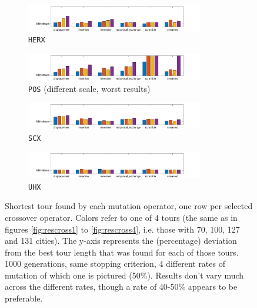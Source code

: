 \begin{figure}[H]
	\centering
%
	\begin{subfigure}[b]{\textwidth}
		\centering
		\includegraphics[width=0.85\textwidth]{mutation/min/xedge_heuristic.png}
		\caption{\texttt{HERX}}
		\label{fig:z}
    	\end{subfigure}
	\begin{subfigure}[b]{\textwidth}
		\centering
		\includegraphics[width=0.85\textwidth]{mutation/min/xposition_based.png}
		\caption{\texttt{POS} (different scale, worst results)}
		\label{fig:z}
    	\end{subfigure}
	\begin{subfigure}[b]{\textwidth}
		\centering
		\includegraphics[width=0.85\textwidth]{mutation/min/xseq_constructive.png}
		\caption{\texttt{SCX}}
		\label{fig:z}
    	\end{subfigure}
	\begin{subfigure}[b]{\textwidth}
		\centering
		\includegraphics[width=0.85\textwidth]{mutation/min/xunnamed.png}
		\caption{\texttt{UHX}}
		\label{fig:z}
    	\end{subfigure}
	\caption{Shortest tour found by each mutation operator, one row per selected crossover operator. Colors refer to one of 4 tours (the same as in figures \ref{fig:rescross1} to \ref{fig:rescross4}, i.e. those with 70, 100, 127 and 131 cities). The y-axis represents the (percentage) deviation from the best tour length that was found for each of those tours. 1000 generations, same stopping criterion, 4 different rates of mutation of which one is pictured (50\%). Results don't vary much across the different rates, though a rate of 40-50\% appears to be preferable.}
	\label{fig:resmut1}
\end{figure}

